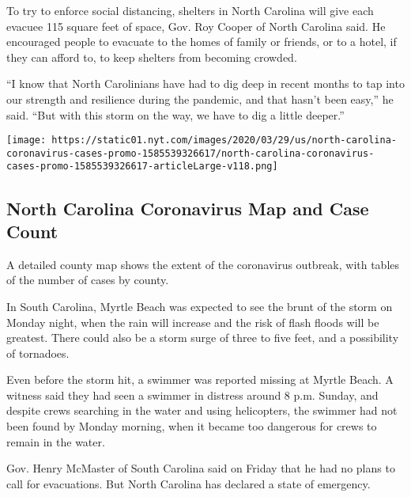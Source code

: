 To try to enforce social distancing, shelters in North Carolina will
give each evacuee 115 square feet of space, Gov. Roy Cooper of North
Carolina said. He encouraged people to evacuate to the homes of family
or friends, or to a hotel, if they can afford to, to keep shelters from
becoming crowded.

``I know that North Carolinians have had to dig deep in recent months to
tap into our strength and resilience during the pandemic, and that
hasn't been easy,'' he said. ``But with this storm on the way, we have
to dig a little deeper.''

\href{https://www.nytimes.com/interactive/2020/us/north-carolina-coronavirus-cases.html}{}

\texttt{[image: https://static01.nyt.com/images/2020/03/29/us/north-carolina-coronavirus-cases-promo-1585539326617/north-carolina-coronavirus-cases-promo-1585539326617-articleLarge-v118.png]}

\hypertarget{north-carolina-coronavirus-map-and-case-count}{%
\subsection{North Carolina Coronavirus Map and Case
Count}\label{north-carolina-coronavirus-map-and-case-count}}

A detailed county map shows the extent of the coronavirus outbreak, with
tables of the number of cases by county.

In South Carolina, Myrtle Beach was expected to see the brunt of the
storm on Monday night, when the rain will increase and the risk of flash
floods will be greatest. There could also be a storm surge of three to
five feet, and a possibility of tornadoes.

Even before the storm hit, a swimmer was reported missing at Myrtle
Beach. A witness said they had seen a swimmer in distress around 8 p.m.
Sunday, and despite crews searching in the water and using helicopters,
the swimmer had not been found by Monday morning, when it became too
dangerous for crews to remain in the water.

Gov. Henry McMaster of South Carolina said on Friday that he had no
plans to call for evacuations. But North Carolina has declared a state
of emergency.

\hypertarget{-2}{%
\subsection{}\label{-2}}

